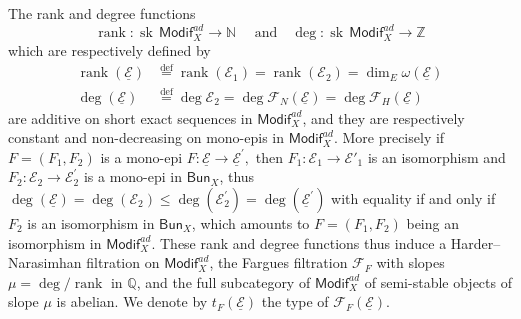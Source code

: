 \documentclass[11pt]{article}
\theoremstyle{definition}
\numberwithin{equation}{section}
\numberwithin{figure}{section}
\numberwithin{table}{section}
\newcommand{\Modif}{\mathsf{Modif}}
\newcommand{\Bun}{\mathsf{Bun}}
\DeclareMathOperator{\rank}{rank}
\DeclareMathOperator{\sk}{sk}
\newcommand{\eqd}{\stackrel{\mathrm{def}}{=}}
\begin{document}
The rank and degree functions
\[
\rank:\sk\,\Modif_{X}^{ad}\rightarrow\mathbb{N}\quad\text{ and}\quad\deg:\sk\,\Modif_{X}^{ad}\rightarrow\mathbb{Z}
\]
which are respectively defined by
\[
\begin{aligned}\rank(\underline{\mathcal{E}}) & \eqd\rank(\mathcal{E}_{1})=\rank(\mathcal{E}_{2})=\dim_{E}\omega(\underline{\mathcal{E}})\\
\deg(\underline{\mathcal{E}}) & \eqd\deg\mathcal{E}_{2}=\deg\mathcal{F}_{N}(\underline{\mathcal{E}})=\deg\mathcal{F}_{H}(\underline{\mathcal{E}})
\end{aligned}
\]
$ $are additive on short exact sequences in $\Modif_{X}^{ad}$, and they are respectively constant and non-decreasing on mono-epis in $\Modif_{X}^{ad}$. More precisely if $F=(F_{1},F_{2})$ is a mono-epi $F:\underline{\mathcal{E}}\rightarrow\underline{\mathcal{E}}^{\prime},$ then $F_{1}:\mathcal{E}_{1}\rightarrow\mathcal{E}'_{1}$ is an isomorphism and $F_{2}:\mathcal{E}_{2}\rightarrow\mathcal{E}_{2}^{\prime}$ is a mono-epi in $\Bun_{X}$, thus $\deg(\underline{\mathcal{E}})=\deg(\mathcal{E}_{2})\leq\deg(\mathcal{E}_{2}^{\prime})=\deg(\underline{\mathcal{E}}^{\prime})$ with equality if and only if $F_{2}$ is an isomorphism in $\Bun_{X}$, which amounts to $F=(F_{1},F_{2})$ being an isomorphism in $\Modif_{X}^{ad}$. These rank and degree functions thus induce a Harder--Narasimhan filtration on $\Modif_{X}^{ad}$, the Fargues filtration $\mathcal{F}_{F}$ with slopes $\mu=\deg/\rank$ in $\mathbb{Q}$, and the full subcategory of $\Modif_{X}^{ad}$ of semi-stable objects of slope $\mu$ is abelian. We denote by $t_{F}(\underline{\mathcal{E}})$ the type of $\mathcal{F}_{F}(\underline{\mathcal{E}})$.
\end{document}
